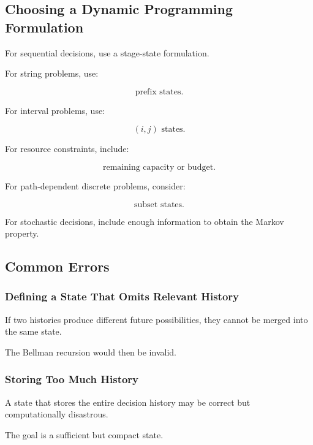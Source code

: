 \subsection{Choosing a Dynamic Programming Formulation}
\label{subsec:choosing-dp-formulation}

For sequential decisions, use a stage-state formulation.

For string problems, use:

\[
\boxed{
\text{prefix states}.
}
\]

For interval problems, use:

\[
\boxed{
(i,j)
\text{ states}.
}
\]

For resource constraints, include:

\[
\boxed{
\text{remaining capacity or budget}.
}
\]

For path-dependent discrete problems, consider:

\[
\boxed{
\text{subset states}.
}
\]

For stochastic decisions, include enough information to obtain the Markov
property.

\subsection{Common Errors}
\label{subsec:dynamic-programming-common-errors}

\subsubsection{Defining a State That Omits Relevant History}

If two histories produce different future possibilities, they cannot be
merged into the same state.

The Bellman recursion would then be invalid.

\subsubsection{Storing Too Much History}

A state that stores the entire decision history may be correct but
computationally disastrous.

The goal is a sufficient but compact state.

